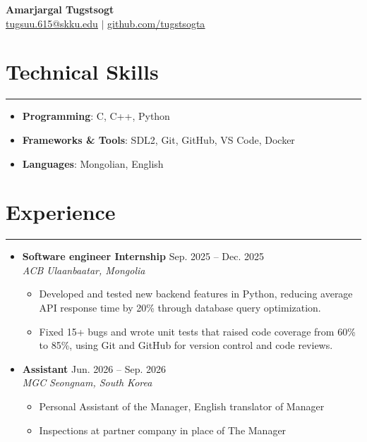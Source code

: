 \documentclass[letterpaper,10pt]{article}
\begin{document}
\begin{center}
    \textbf{\LARGE Amarjargal Tugstsogt} \\
    \vspace{2pt}
    \href{mailto:tugsuu.615@skku.edu}{\underline{tugsuu.615@skku.edu}} $|$
    \href{https://github.com/tugstsogta}{\underline{github.com/tugstsogta}}
\end{center}

\section*{Technical Skills}
\hrule
\vspace{4pt}
\begin{itemize}
    \item[] \textbf{Programming}: C, C++, Python          %
    \item[] \textbf{Frameworks \& Tools}: SDL2, Git, GitHub, VS Code, Docker %
    \item[] \textbf{Languages}: Mongolian, English           %
\end{itemize}

\section*{Experience}
\hrule
\vspace{4pt}
\begin{itemize}
    \item[]
    \textbf{Software engineer Internship} \hfill Sep. 2025 -- Dec. 2025 \\    %
    \textit{ACB}  \hfill \textit{Ulaanbaatar, Mongolia}
    \begin{itemize}
        \item Developed and tested new backend features in Python, reducing average API response time by 20\% through database query optimization.
        \item Fixed 15+ bugs and wrote unit tests that raised code coverage from 60\% to 85\%, using Git and GitHub for version control and code reviews.
    \end{itemize}

    \item[]
    \textbf{Assistant} \hfill Jun. 2026 -- Sep. 2026 \\    %
    \textit{MGC} \hfill \textit{Seongnam, South Korea}
    \begin{itemize}
        \item Personal Assistant of the Manager, English translator of Manager
        \item Inspections at partner company in place of The Manager
    \end{itemize}
\end{itemize}
\end{document}
